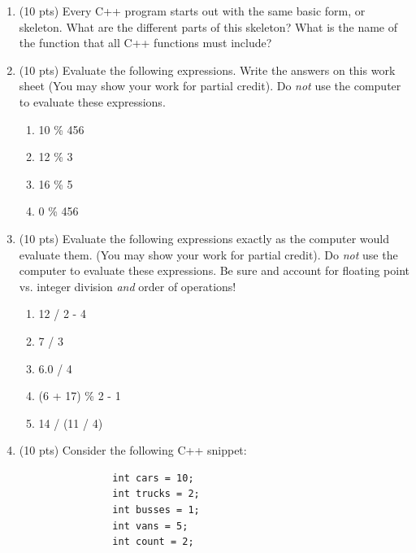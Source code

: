 \documentclass[letterpaper,12pt]{article}
\begin{document}
\begin{enumerate}
    \item(10 pts) Every C++ program starts out with the same basic form, or skeleton.
         What are the different parts of this skeleton?
         What is the name of the function that all C++ functions must include?
    \vspace{40mm}
    \item(10 pts) Evaluate the following expressions.
         Write the answers on this work sheet (You may show your work for partial credit).
         Do \emph{not} use the computer to evaluate these expressions.
         \begin{enumerate}
             \item 10 \% 456
             \item 12 \% 3
             \item 16 \% 5
             \item 0 \% 456
         \end{enumerate}
    \item (10 pts) Evaluate the following expressions exactly as the computer would evaluate them.
          (You may show your work for partial credit). Do \emph{not} use the computer to evaluate
          these expressions. Be sure and account for floating point vs. integer division \emph{and}
          order of operations!
            \begin{enumerate}
                \item 12 / 2 - 4
                \item 7 / 3
                \item 6.0 / 4
                \item (6 + 17) \% 2 - 1
                \item 14 / (11 / 4)
            \end{enumerate}
    \item (10 pts) Consider the following C++ snippet:
            \begin{lstlisting}
                int cars = 10;
                int trucks = 2;
                int busses = 1;
                int vans = 5;
                int count = 2;


\end{lstlisting}
\end{enumerate}
\end{document}
